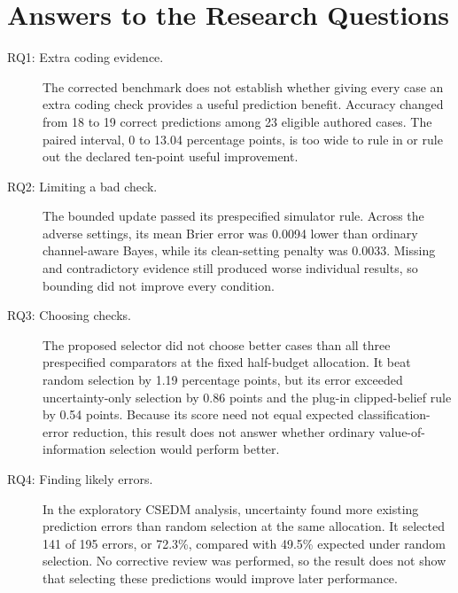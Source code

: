 \section{Answers to the Research Questions}

\begin{description}
  \item[RQ1: Extra coding evidence.] The corrected benchmark does not establish whether giving every case an extra coding
  check provides a useful prediction benefit. Accuracy changed from 18 to 19 correct predictions among 23 eligible authored
  cases. The paired interval, 0 to 13.04 percentage points, is too wide to rule in or rule out the declared ten-point useful
  improvement.

  \item[RQ2: Limiting a bad check.] The bounded update passed its prespecified simulator rule. Across the adverse settings,
  its mean Brier error was 0.0094 lower than ordinary channel-aware Bayes, while its clean-setting penalty was 0.0033. Missing
  and contradictory evidence still produced worse individual results, so bounding did not improve every condition.

  \item[RQ3: Choosing checks.] The proposed selector did not choose better cases than all three prespecified comparators at
  the fixed half-budget allocation. It beat random selection by 1.19 percentage points, but its error exceeded
  uncertainty-only selection by 0.86 points and the plug-in clipped-belief rule by 0.54 points. Because its score need not
  equal expected classification-error reduction, this result does not answer whether ordinary value-of-information selection
  would perform better.

  \item[RQ4: Finding likely errors.] In the exploratory CSEDM analysis, uncertainty found more existing prediction errors
  than random selection at the same allocation. It selected 141 of 195 errors, or 72.3\%, compared with 49.5\% expected under
  random selection. No corrective review was performed, so the result does not show that selecting these predictions would
  improve later performance.
\end{description}
